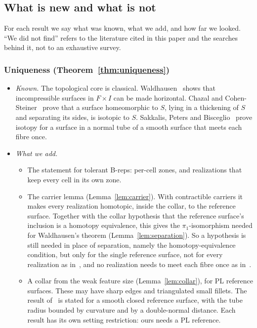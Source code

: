 \subsection{What is new and what is not}
For each result we say what was known, what we add, and how far we looked. ``We did not find'' refers to the
literature cited in this paper and the searches behind it, not to an exhaustive survey.

\subsubsection*{Uniqueness (Theorem~\ref{thm:uniqueness})}
\begin{itemize}
\item \emph{Known.} The topological core is classical. Waldhausen~\cite[Prop.~3.1]{Waldhausen68} shows that
incompressible surfaces in $F\times I$ can be made horizontal. Chazal and Cohen-Steiner~\cite[Thm.~2.1]{CCS05} prove
that a surface homeomorphic to $S$, lying in a thickening of $S$ and separating its sides, is isotopic to $S$.
Sakkalis, Peters and Bisceglio~\cite[Thm.~10]{SPB04} prove isotopy for a surface in a normal tube of a smooth surface
that meets each fibre once.
\item \emph{What we add.}
  \begin{itemize}
  \item The statement for tolerant B-reps: per-cell zones, and realizations that keep every cell in its own zone.
  \item The carrier lemma (Lemma~\ref{lem:carrier}). With contractible carriers it makes every realization homotopic,
  inside the collar, to the reference surface. Together with the collar hypothesis that the reference surface's
  inclusion is a homotopy equivalence, this gives the $\pi_1$-isomorphism needed for Waldhausen's theorem
  (Lemma~\ref{lem:separation}). So a hypothesis is still needed in place of separation, namely the homotopy-equivalence
  condition, but only for the single reference surface, not for every realization as in~\cite{CCS05}, and no realization needs to meet each fibre once as
  in~\cite{SPB04}.
  \item A collar from the weak feature size (Lemma~\ref{lem:collar}), for PL reference surfaces. These may have sharp
  edges and triangulated small fillets. The result of~\cite{SPB04} is stated for a smooth closed reference surface, with
  the tube radius bounded by curvature and by a double-normal distance. Each result has its own setting restriction:
  ours needs a PL reference.

\end{itemize}
\end{itemize}
